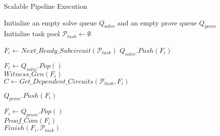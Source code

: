 \begin{algorithm}[t]
\caption{Scalable Pipeline Execution}
\label{alg:pipeline}

Initialize an empty solve queue \( Q_{\text{solve}} \) and an empty prove queue \( Q_{\text{prove}} \) \label{stmt:pipeline_init_start}\\
Initialize task pool $\mathcal{P}_{task}\gets \emptyset$ \label{stmt:pipeline_init_end}



\vspace{3pt}

 {
    $F_i\gets Next\_Ready\_Subcircuit(\mathcal{P}_{task})$  
    $Q_{solve}.Push(F_i)$ \label{stmt:schedule_end}\\ 
}
\vspace{3pt}

 {
    $F_i\gets Q_{solve}.Pop()$\\
    $Witness\_Gen(F_i)$\\
    
    $C \gets Get\_Dependent\_Circuits(\mathcal{P}_{task}, F_i)$ 

    $Q_{prove}.Push(F_i)$ \label{stmt:solve_state_end}
}
\vspace{3pt}

 {
    $F_i\gets Q_{prove}.Pop()$\\
    $Proof\_Com(F_i)$\\
    $Finish(F_i, \mathcal{P}_{task})$\label{stmt:prove_stage_end}
}
\end{algorithm}

